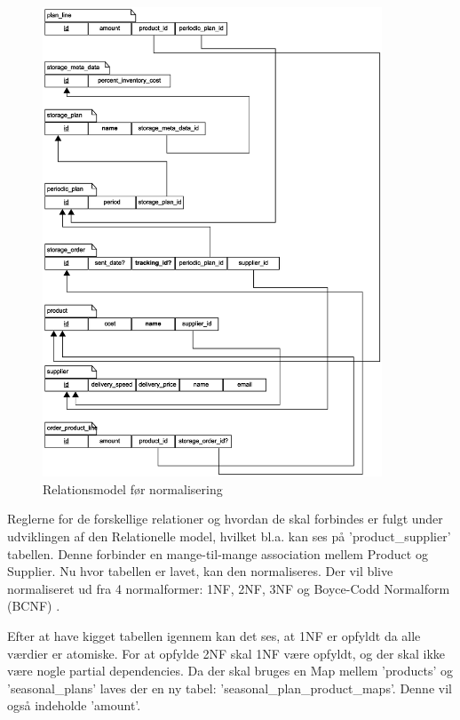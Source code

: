\begin{figure}[H]
    \centering
    \includegraphics[width=0.9\textwidth]{figures/krav/relation_model_0th_normalization.eps}
    \caption{Relationsmodel før normalisering}
    \label{fig:relational_model_0}
\end{figure}

Reglerne for de forskellige relationer og hvordan de skal forbindes er fulgt under udviklingen af den Relationelle model, hvilket bl.a. kan ses på 'product\_supplier' tabellen. Denne forbinder en mange-til-mange association mellem Product og Supplier. 
Nu hvor tabellen er lavet, kan den normaliseres. Der vil blive normaliseret ud fra 4 normalformer: 1NF, 2NF, 3NF og Boyce-Codd Normalform (BCNF) \cite{DatabaseSystems}.

Efter at have kigget tabellen igennem kan det ses, at 1NF er opfyldt da alle værdier er atomiske.
For at opfylde 2NF skal 1NF være opfyldt, og der skal ikke være nogle partial dependencies. Da der skal bruges en Map mellem 'products' og 'seasonal\_plans' laves der en ny tabel: 'seasonal\_plan\_product\_maps'. Denne vil også indeholde 'amount'.

